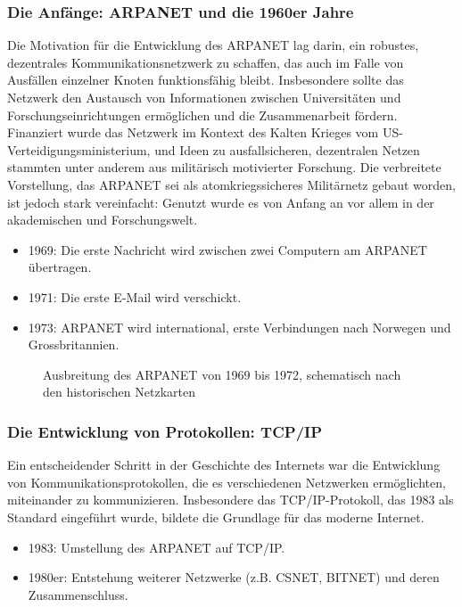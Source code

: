 \subsubsection*{Die Anfänge: ARPANET und die 1960er Jahre}
Die Motivation für die Entwicklung des \gls{ARPANET} lag darin, ein robustes, dezentrales Kommunikationsnetzwerk zu schaffen, das auch im Falle von Ausfällen einzelner Knoten funktionsfähig bleibt. Insbesondere sollte das Netzwerk den Austausch von Informationen zwischen Universitäten und Forschungseinrichtungen ermöglichen und die Zusammenarbeit fördern. Finanziert wurde das Netzwerk im Kontext des Kalten Krieges vom US-Verteidigungsministerium, und Ideen zu ausfallsicheren, dezentralen Netzen stammten unter anderem aus militärisch motivierter Forschung. Die verbreitete Vorstellung, das \gls{ARPANET} sei als atomkriegssicheres Militärnetz gebaut worden, ist jedoch stark vereinfacht: Genutzt wurde es von Anfang an vor allem in der akademischen und Forschungswelt.

\begin{itemize}
	\item 1969: Die erste Nachricht wird zwischen zwei Computern am \gls{ARPANET} übertragen.
	\item 1971: Die erste E-Mail wird verschickt.
	\item 1973: \gls{ARPANET} wird international, erste Verbindungen nach Norwegen und Grossbritannien.
\end{itemize}

\begin{figure}[H]
	\centering
	\resizebox{\linewidth}{!}{}
	\caption{Ausbreitung des \gls{ARPANET} von 1969 bis 1972, schematisch nach den historischen Netzkarten}
\end{figure}

\subsubsection*{Die Entwicklung von Protokollen: \texorpdfstring{\acrshort{TCP}/\acrshort{IP}}{TCP/IP}}
Ein entscheidender Schritt in der Geschichte des Internets war die Entwicklung von Kommunikationsprotokollen, die es verschiedenen Netzwerken ermöglichten, miteinander zu kommunizieren. Insbesondere das \gls{TCP}/\gls{IP}-Protokoll, das 1983 als Standard eingeführt wurde, bildete die Grundlage für das moderne Internet.

\begin{itemize}
	\item 1983: Umstellung des \gls{ARPANET} auf \gls{TCP}/\gls{IP}.
	\item 1980er: Entstehung weiterer Netzwerke (z.B. CSNET, BITNET) und deren Zusammenschluss.
\end{itemize}


